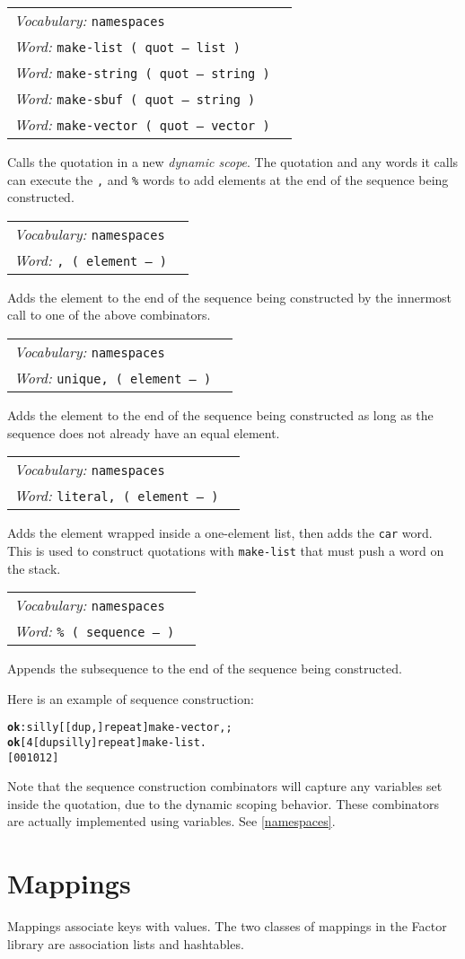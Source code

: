 \documentclass{book}
\newcommand{\tto}{\symbol{123}}
\newcommand{\ttc}{\symbol{125}}
\newcommand{\vocabulary}[1]{\emph{Vocabulary:} \texttt{#1}&\\}
\newcommand{\ordinaryword}[2]{\index{\texttt{#1}}\emph{Word:} \texttt{#2}&\\}
\newcommand{\wordtable}[1]{

\begin{tabularx}{12cm}[t]{lX}
\hline
#1
\hline
\end{tabularx}

}
\begin{document}
\newcommand{\dynamicscopeglos}{}
\dynamicscopeglos
\wordtable{
\vocabulary{namespaces}
\ordinaryword{make-list}{make-list ( quot -- list )}
\ordinaryword{make-string}{make-string ( quot -- string )}
\ordinaryword{make-sbuf}{make-sbuf ( quot -- string )}
\ordinaryword{make-vector}{make-vector ( quot -- vector )}
}
Calls the quotation in a new \emph{dynamic scope}. The quotation and any words it calls can execute the \texttt{,} and \texttt{\%} words to add elements at the end of the sequence being constructed.
\wordtable{
\vocabulary{namespaces}
\ordinaryword{,}{,~( element -- )}
}
Adds the element to the end of the sequence being constructed by the innermost call to one of the above combinators.
\wordtable{
\vocabulary{namespaces}
\ordinaryword{unique,}{unique,~( element -- )}
}
Adds the element to the end of the sequence being constructed as long as the sequence does not already have an equal element.
\wordtable{
\vocabulary{namespaces}
\ordinaryword{literal,}{literal,~( element -- )}
}
Adds the element wrapped inside a one-element list, then adds the \texttt{car} word. This is used to construct quotations with \texttt{make-list} that must push a word on the stack.
\wordtable{
\vocabulary{namespaces}
\ordinaryword{\%}{\% ( sequence -- )}
}
Appends the subsequence to the end of the sequence being constructed.

Here is an example of sequence construction:
\begin{alltt}
\textbf{ok} : silly [ [ dup , ] repeat ] make-vector , ;
\textbf{ok} [ 4 [ dup silly ] repeat ] make-list .
[ \tto \ttc \tto 0 \ttc \tto 0 1 \ttc \tto 0 1 2 \ttc ]
\end{alltt}

Note that the sequence construction combinators will capture any variables set inside the quotation, due to the dynamic scoping behavior. These combinators are actually implemented using variables. See \ref{namespaces}.

\section{Mappings}


Mappings associate keys with values. The two classes of mappings in the Factor library are association lists and hashtables.
\end{document}

